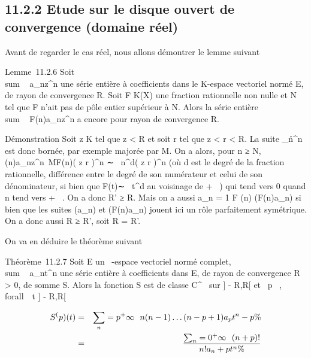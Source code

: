 \documentclass[]{article}
\begin{document}
\subsection{11.2.2 Etude sur le disque ouvert de convergence (domaine
réel)}

Avant de regarder le cas réel, nous allons démontrer le lemme suivant

Lemme~11.2.6 Soit \\sum ~
a_nz^n une série entière à coefficients dans le
K-espace vectoriel normé E, de rayon de convergence R. Soit F \in K(X) une
fraction rationnelle non nulle et N \in {}~ tel que F n'ait pas de pôle
entier supérieur à N. Alors la série entière
\\sum ~
F(n)a_nz^n a encore pour rayon de convergence R.

Démonstration Soit z \in K tel que z < R et
soit r tel que z < r < R. La
suite
\a_n\r^n
est donc bornée, par exemple majorée par M. On a alors, pour n ≥ N,
\F(n)a_nz^n\
\leq MF(n)\left (
z \over r \right
)^n ∼ \lambda~n^d\left (
z \over r \right
)^n (où d est le degré de la fraction rationnelle, différence
entre le degré de son numérateur et celui de son dénominateur, si bien
que F(t)∼ \lambda~t^d au voisinage de + \infty~) qui
tend vers 0 quand n tend vers + \infty~. On a donc R' ≥ R. Mais on a aussi
a_n = 1 \over F (n)\left
(F(n)a_n\right ) si bien que les suites
(a_n) et (F(n)a_n) jouent ici un rôle parfaitement
symétrique. On a donc aussi R ≥ R', soit R = R'.

On va en déduire le théorème suivant

Théorème~11.2.7 Soit E un ~-espace vectoriel normé complet,
\\sum ~
a_nt^n une série entière à coefficients dans E, de
rayon de convergence R > 0, de somme S. Alors la fonction S
est de classe C^\infty~ sur ] - R,R[ et
\forall~p \in {}~, \\forall~~t \in] -
R,R[

\begin{align*} S^(p)(t)& =&
\sum _n=p^+\infty~~n(n -
1)\ldots(n - p + 1)a_
pt^n-p\%& \\ & =&
\sum _n=0^+\infty~~ (n + p)!
\over n! a_n+pt^n \%&
\\ \end{align*}
\end{document}
